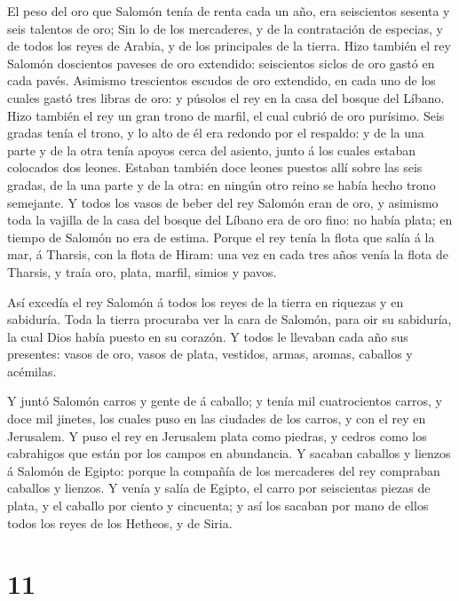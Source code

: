  El peso del oro que Salomón tenía de renta cada un año,
era seiscientos sesenta y seis talentos de oro;  Sin lo de
los mercaderes, y de la contratación de especias, y de todos los reyes
de Arabia, y de los principales de la tierra.  Hizo también
el rey Salomón doscientos paveses de oro extendido: seiscientos siclos
de oro gastó en cada pavés.  Asimismo trescientos escudos
de oro extendido, en cada uno de los cuales gastó tres libras de oro: y
púsolos el rey en la casa del bosque del Líbano.  Hizo
también el rey un gran trono de marfil, el cual cubrió de oro purísimo.
 Seis gradas tenía el trono, y lo alto de él era redondo
por el respaldo: y de la una parte y de la otra tenía apoyos cerca del
asiento, junto á los cuales estaban colocados dos leones. 
Estaban también doce leones puestos allí sobre las seis gradas, de la
una parte y de la otra: en ningún otro reino se había hecho trono
semejante.  Y todos los vasos de beber del rey Salomón eran
de oro, y asimismo toda la vajilla de la casa del bosque del Líbano era
de oro fino: no había plata; en tiempo de Salomón no era de estima.
 Porque el rey tenía la flota que salía á la mar, á
Tharsis, con la flota de Hiram: una vez en cada tres años venía la flota
de Tharsis, y traía oro, plata, marfil, simios y pavos.

 Así excedía el rey Salomón á todos los reyes de la tierra
en riquezas y en sabiduría.  Toda la tierra procuraba ver
la cara de Salomón, para oir su sabiduría, la cual Dios había puesto en
su corazón.  Y todos le llevaban cada año sus presentes:
vasos de oro, vasos de plata, vestidos, armas, aromas, caballos y
acémilas.

 Y juntó Salomón carros y gente de á caballo; y tenía mil
cuatrocientos carros, y doce mil jinetes, los cuales puso en las
ciudades de los carros, y con el rey en Jerusalem.  Y puso
el rey en Jerusalem plata como piedras, y cedros como los cabrahigos que
están por los campos en abundancia.  Y sacaban caballos y
lienzos á Salomón de Egipto: porque la compañía de los mercaderes del
rey compraban caballos y lienzos.  Y venía y salía de
Egipto, el carro por seiscientas piezas de plata, y el caballo por
ciento y cincuenta; y así los sacaban por mano de ellos todos los reyes
de los Hetheos, y de Siria.

\hypertarget{section-10}{%
\section{11}\label{section-10}}

